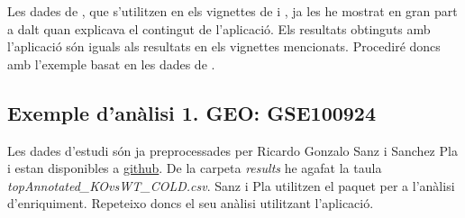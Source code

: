 \documentclass[]{article}
\begin{document}
Les dades de \cite{schmidt2008humoral}, que s'utilitzen en els vignettes de  i , ja les he mostrat en gran part a dalt quan explicava el contingut de l'aplicació. Els resultats obtinguts amb l'aplicació són iguals als resultats en els vignettes mencionats. Procediré doncs amb l'exemple basat en les dades de \cite{li2017zbtb7b} .

\subsection{Exemple d'anàlisi 1. GEO: GSE100924}

Les dades d'estudi \cite{li2017zbtb7b} són ja preprocessades per Ricardo Gonzalo Sanz i Sanchez Pla i estan disponibles a \href{https://github.com/alexsanchezpla/StatisticalAnalysisOfMicroarrayData}{github}. De la carpeta \textit{results} he agafat la taula \textit{topAnnotated\_KOvsWT\_COLD.csv}. Sanz i Pla utilitzen el paquet  per a l'anàlisi d'enriquiment. Repeteixo doncs el seu anàlisi utilitzant l'aplicació. 
\end{document}
